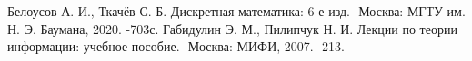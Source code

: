 \begin{thebibliography}{}
	 Белоусов А. И., Ткачёв С. Б. Дискретная математика: 6-е изд. -Москва: МГТУ им. Н. Э. Баумана, 2020. -703с.
	 Габидулин Э. М., Пилипчук Н. И. Лекции по теории информации: учебное пособие. -Москва: МИФИ, 2007. -213.
\end{thebibliography}
